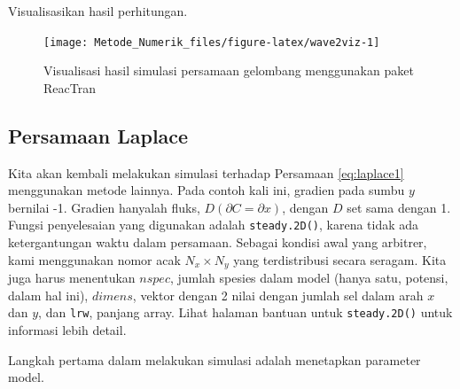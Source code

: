 \documentclass[]{book}
\newenvironment{Shaded}{\begin{snugshade}}{\end{snugshade}}
\newcommand{\DataTypeTok}[1]{\textcolor[rgb]{0.13,0.29,0.53}{#1}}
\newcommand{\DecValTok}[1]{\textcolor[rgb]{0.00,0.00,0.81}{#1}}
\newcommand{\KeywordTok}[1]{\textcolor[rgb]{0.13,0.29,0.53}{\textbf{#1}}}
\newcommand{\NormalTok}[1]{#1}
\newcommand{\OperatorTok}[1]{\textcolor[rgb]{0.81,0.36,0.00}{\textbf{#1}}}
\newcommand{\StringTok}[1]{\textcolor[rgb]{0.31,0.60,0.02}{#1}}
\theoremstyle{definition}
\theoremstyle{definition}
\theoremstyle{definition}
\theoremstyle{remark}
\begin{document}
Visualisasikan hasil perhitungan.

\begin{figure}

{\centering \texttt{[image: Metode\_Numerik\_files/figure-latex/wave2viz-1]} 

}

\caption{Visualisasi hasil simulasi persamaan gelombang menggunakan paket ReacTran}\label{fig:wave2viz}
\end{figure}

\hypertarget{persamaan-laplace}{%
\subsection{Persamaan Laplace}\label{persamaan-laplace}}

Kita akan kembali melakukan simulasi terhadap Persamaan \eqref{eq:laplace1} menggunakan metode lainnya. Pada contoh kali ini, gradien pada sumbu \(y\) bernilai -1. Gradien hanyalah fluks, \(D \left(\partial C = \partial x\right)\), dengan \(D\) set sama dengan 1. Fungsi penyelesaian yang digunakan adalah \texttt{steady.2D()}, karena tidak ada ketergantungan waktu dalam persamaan. Sebagai kondisi awal yang arbitrer, kami menggunakan nomor acak \(N_x \times N_y\) yang terdistribusi secara seragam. Kita juga harus menentukan \(nspec\), jumlah spesies dalam model (hanya satu, potensi, dalam hal ini), \(dimens\), vektor dengan 2 nilai dengan jumlah sel dalam arah \(x\) dan \(y\), dan \texttt{lrw}, panjang array. Lihat halaman bantuan untuk \texttt{steady.2D()} untuk informasi lebih detail.

Langkah pertama dalam melakukan simulasi adalah menetapkan parameter model.

\begin{Shaded}
\end{Shaded}
\end{document}
